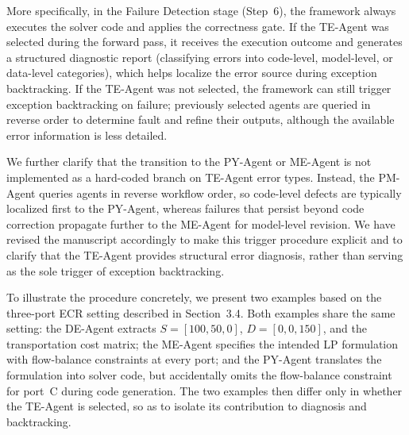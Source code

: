 \documentclass[11pt,a4paper]{article}
\begin{document}
More specifically, in the Failure Detection stage (Step~6), the framework always executes the solver code and applies the correctness gate. If the TE-Agent was selected during the forward pass, it receives the execution outcome and generates a structured diagnostic report (classifying errors into code-level, model-level, or data-level categories), which helps localize the error source during exception backtracking. If the TE-Agent was not selected, the framework can still trigger exception backtracking on failure; previously selected agents are queried in reverse order to determine fault and refine their outputs, although the available error information is less detailed.

We further clarify that the transition to the PY-Agent or ME-Agent is not implemented as a hard-coded branch on TE-Agent error types. Instead, the PM-Agent queries agents in reverse workflow order, so code-level defects are typically localized first to the PY-Agent, whereas failures that persist beyond code correction propagate further to the ME-Agent for model-level revision. We have revised the manuscript accordingly to make this trigger procedure explicit and to clarify that the TE-Agent provides structural error diagnosis, rather than serving as the sole trigger of exception backtracking.

To illustrate the procedure concretely, we present two examples based on the three-port ECR setting described in Section~3.4. Both examples share the same setting: the DE-Agent extracts $S{=}[100,50,0]$, $D{=}[0,0,150]$, and the transportation cost matrix; the ME-Agent specifies the intended LP formulation with flow-balance constraints at every port; and the PY-Agent translates the formulation into solver code, but accidentally omits the flow-balance constraint for port~C during code generation. The two examples then differ only in whether the TE-Agent is selected, so as to isolate its contribution to diagnosis and backtracking.
\end{document}
